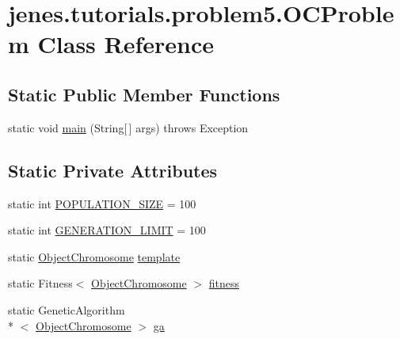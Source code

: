 \hypertarget{classjenes_1_1tutorials_1_1problem5_1_1_o_c_problem}{\section{jenes.\-tutorials.\-problem5.\-O\-C\-Problem Class Reference}
\label{classjenes_1_1tutorials_1_1problem5_1_1_o_c_problem}
}
\subsection*{Static Public Member Functions}
\begin{DoxyCompactItemize}
\item 
static void \hyperlink{classjenes_1_1tutorials_1_1problem5_1_1_o_c_problem_aecd726bedeefdb1bfce0b0d453bef17e}{main} (String\mbox{[}$\,$\mbox{]} args)  throws Exception 
\end{DoxyCompactItemize}
\subsection*{Static Private Attributes}
\begin{DoxyCompactItemize}
\item 
static int \hyperlink{classjenes_1_1tutorials_1_1problem5_1_1_o_c_problem_a6f83b4fb8527ded39ad6dd116e7677e7}{P\-O\-P\-U\-L\-A\-T\-I\-O\-N\-\_\-\-S\-I\-Z\-E} = 100
\item 
static int \hyperlink{classjenes_1_1tutorials_1_1problem5_1_1_o_c_problem_a5ca815ddd4d090d3bfc74d0a1d3dfeab}{G\-E\-N\-E\-R\-A\-T\-I\-O\-N\-\_\-\-L\-I\-M\-I\-T} = 100
\item 
static \hyperlink{classjenes_1_1chromosome_1_1_object_chromosome}{Object\-Chromosome} \hyperlink{classjenes_1_1tutorials_1_1problem5_1_1_o_c_problem_a0a60e116ef66b31e038f3c29ba23188a}{template}
\item 
static Fitness$<$ \hyperlink{classjenes_1_1chromosome_1_1_object_chromosome}{Object\-Chromosome} $>$ \hyperlink{classjenes_1_1tutorials_1_1problem5_1_1_o_c_problem_a568ec7d71c8cdcca7cb01674dac7fd62}{fitness}
\item 
static Genetic\-Algorithm\\*
$<$ \hyperlink{classjenes_1_1chromosome_1_1_object_chromosome}{Object\-Chromosome} $>$ \hyperlink{classjenes_1_1tutorials_1_1problem5_1_1_o_c_problem_ad2413f0f7718203ea23a643ca7dd8769}{ga}
\end{DoxyCompactItemize}


